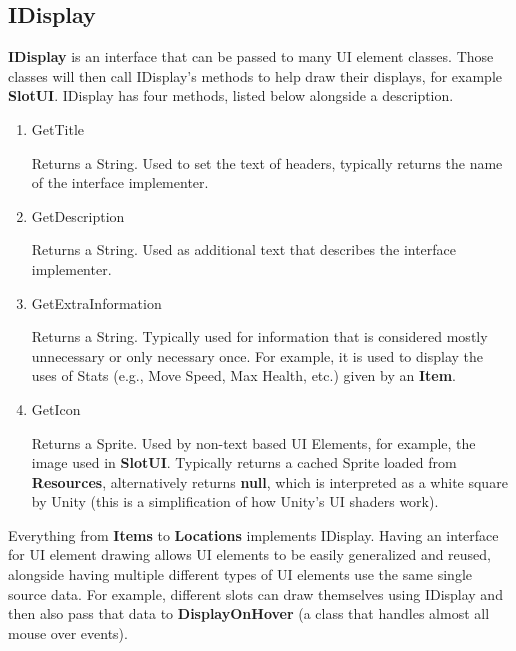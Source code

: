 \documentclass{report}
\begin{document}
\subsection{IDisplay}

\textbf{IDisplay} is an interface that can be passed to many UI element classes. Those classes will then call IDisplay's methods to help draw their displays, for example \textbf{SlotUI}. IDisplay has four methods, listed below alongside a description.

\begin{enumerate}

	\item GetTitle

Returns a String. Used to set the text of headers, typically returns the name of the interface implementer.

	\item GetDescription

Returns a String. Used as additional text that describes the interface implementer.

	\item GetExtraInformation

Returns a String. Typically used for information that is considered mostly unnecessary or only necessary once. For example, it is used to display the uses of Stats (e.g., Move Speed, Max Health, etc.) given by an \textbf{Item}.

	\item GetIcon

Returns a Sprite. Used by non-text based UI Elements, for example, the image used in \textbf{SlotUI}. Typically returns a cached Sprite loaded from \textbf{Resources}, alternatively returns \textbf{null}, which is interpreted as a white square by Unity (this is a simplification of how Unity's UI shaders work).

\end{enumerate}

Everything from \textbf{Items} to \textbf{Locations} implements IDisplay. Having an interface for UI element drawing allows UI elements to be easily generalized and reused, alongside having multiple different types of UI elements use the same single source data. For example, different slots can draw themselves using IDisplay and then also pass that data to \textbf{DisplayOnHover} (a class that handles almost all mouse over events). 
\end{document}
